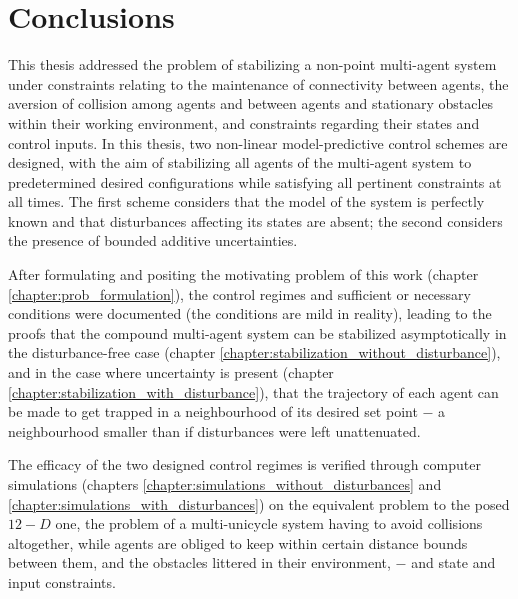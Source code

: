 \chapter{Conclusions}

This thesis addressed the problem of stabilizing a non-point multi-agent system
under constraints relating to the maintenance of connectivity between
agents, the aversion of collision among agents and between agents and
stationary obstacles within their working environment, and constraints
regarding their states and control inputs. In this thesis, two non-linear
model-predictive control schemes are designed, with the aim of stabilizing
all agents of the multi-agent system to predetermined desired configurations
while satisfying all pertinent constraints at all times. The first scheme
considers that the model of the system is perfectly known and that disturbances
affecting its states are absent; the second considers the presence of
bounded additive uncertainties.

After formulating and positing the motivating problem of this work
(chapter \ref{chapter:prob_formulation}), the control regimes and sufficient or
necessary conditions were documented (the conditions are mild in reality),
leading to the proofs that the compound multi-agent system can be stabilized
asymptotically in the disturbance-free case
(chapter \ref{chapter:stabilization_without_disturbance}), and in the case where
uncertainty is present (chapter \ref{chapter:stabilization_with_disturbance}),
that the trajectory of each agent can be made to get trapped in a neighbourhood
of its desired set point $-$ a neighbourhood smaller than if disturbances
were left unattenuated.

The efficacy of the two designed control regimes is verified through computer
simulations (chapters \ref{chapter:simulations_without_disturbances} and
\ref{chapter:simulations_with_disturbances}) on the equivalent problem to the
posed $12-D$ one, the problem of a multi-unicycle system having to avoid
collisions altogether, while agents are obliged to keep within certain distance
bounds between them, and the obstacles littered in their environment, $-$ and
state and input constraints.

